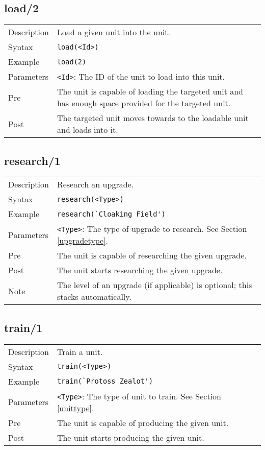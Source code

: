 \subsection{load/2}
\begin{tabularx}{\textwidth}{lX}
 Description & Load a given unit into the unit. \\
 Syntax & \verb|load(<Id>)| \\
 Example & \verb|load(2)| \\
 Parameters & \verb|<Id>|: The ID of the unit to load into this unit. \\
 Pre & The unit is capable of loading the targeted unit and has enough space provided for the targeted unit. \\
 Post & The targeted unit moves towards to the loadable unit and loads into it.
\end{tabularx}

\subsection{research/1}
\begin{tabularx}{\textwidth}{lX}
 Description & Research an upgrade. \\
 Syntax & \verb|research(<Type>)| \\
 Example & \verb|research(`Cloaking Field')| \\
 Parameters & \verb|<Type>|: The type of upgrade to research. See Section \ref{upgradetype}. \\
 Pre & The unit is capable of researching the given upgrade. \\
 Post & The unit starts researching the given upgrade. \\
 Note & The level of an upgrade (if applicable) is optional; this stacks automatically.
\end{tabularx}

\subsection{train/1}
\begin{tabularx}{\textwidth}{lX}
 Description & Train a unit. \\
 Syntax & \verb|train(<Type>)| \\
 Example & \verb|train(`Protoss Zealot')| \\
 Parameters & \verb|<Type>|: The type of unit to train. See Section \ref{unittype}. \\
 Pre & The unit is capable of producing the given unit. \\
 Post & The unit starts producing the given unit.
\end{tabularx}

